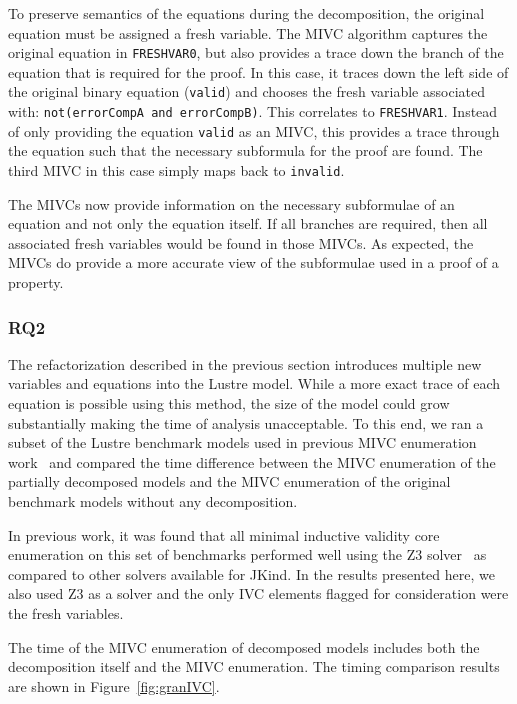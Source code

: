 To preserve semantics of the equations during the decomposition, the original equation must be assigned a fresh variable. The MIVC algorithm captures the original equation in \texttt{FRESHVAR0}, but also provides a trace down the branch of the equation that is required for the proof. In this case, it traces down the left side of the original binary equation (\texttt{valid}) and chooses the fresh variable associated with: \texttt{not(errorCompA and errorCompB)}. This correlates to \texttt{FRESHVAR1}. Instead of only providing the equation \texttt{valid} as an MIVC, this provides a trace through the equation such that the necessary subformula for the proof are found. The third MIVC in this case simply maps back to \texttt{invalid}. 

The MIVCs now provide information on the necessary subformulae of an equation and not only the equation itself. If all branches are required, then all associated fresh variables would be found in those MIVCs. As expected, the MIVCs do provide a more accurate view of the subformulae used in a proof of a property. 

\subsubsection{RQ2}
The refactorization described in the previous section introduces multiple new variables and equations into the Lustre model. While a more exact trace of each equation is possible using this method, the size of the model could grow substantially making the time of analysis unacceptable. To this end, we ran a subset of the Lustre benchmark models used in previous MIVC enumeration work~\cite{ghassabani_2018} and compared the time difference between the MIVC enumeration of the partially decomposed models and the MIVC enumeration of the original benchmark models without any decomposition. 

In previous work, it was found that all minimal inductive validity core enumeration on this set of benchmarks performed well using the Z3 solver~\cite{ghassabani_2018, z3} as compared to other solvers available for JKind. In the results presented here, we also used Z3 as a solver and the only IVC elements flagged for consideration were the fresh variables. 

The time of the MIVC enumeration of decomposed models includes both the decomposition itself and the MIVC enumeration. The timing comparison results are shown in Figure~\ref{fig:granIVC}. 


